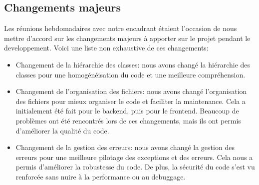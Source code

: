 \subsection{Changements majeurs}

Les réunions hebdomadaires avec notre encadrant étaient l'occasion de nous mettre d'accord sur
les changements majeurs à apporter sur le projet pendant le developpement. Voici une liste non exhaustive de ces changements:

\begin{itemize}
    \item Changement de la hiérarchie des classes: nous avons changé la hiérarchie des classes pour
    une homogénéisation du code et une meilleure compréhension.
    \item Changement de l'organisation des fichiers: nous avons changé l'organisation des fichiers pour
    mieux organiser le code et faciliter la maintenance. Cela a initialement été fait pour le backend, puis
    pour le frontend. Beaucoup de problèmes ont été rencontrés lors de ces changements, mais ils ont permis
    d'améliorer la qualité du code.
    \item Changement de la gestion des erreurs: nous avons changé la gestion des erreurs pour une meilleure
    pilotage des exceptions et des erreurs. Cela nous a permis d'améliorer la robustesse du code.
    De plus,  la sécurité du code s'est vu renforcée sans nuire à la performance ou au debuggage.
\end{itemize}

